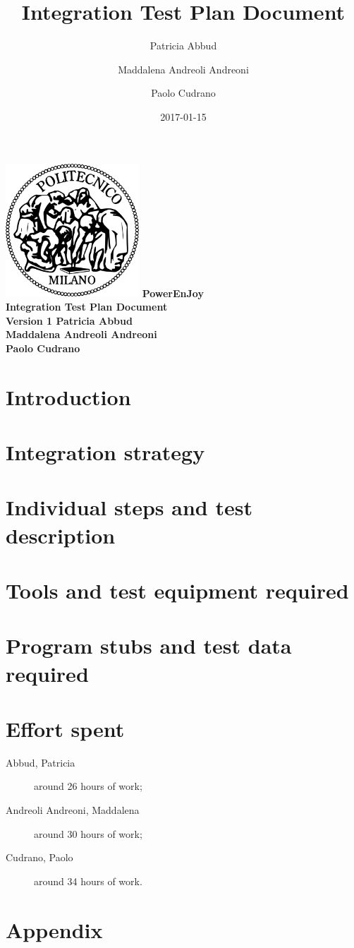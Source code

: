 \documentclass[12pt, a4paper]{article}
\title{Integration Test Plan Document}
\date{2017-01-15}
\author{
	Patricia Abbud
	\and
	Maddalena Andreoli Andreoni
	\and
	Paolo Cudrano
}
\begin{document}
	\begin{titlepage}
		\centering
		\includegraphics[width=5cm]{img/polimi_logo.png} %
		\vfill
		{\bfseries\Large
			PowerEnJoy\\
			Integration Test Plan Document\\
			Version 1
			\vskip4cm
			Patricia Abbud\\
			Maddalena Andreoli Andreoni\\
			Paolo Cudrano\\
		}
		\vfill
		\vfill
	\end{titlepage}

	\tableofcontents
	\newpage

	\section{Introduction}
		

	\newpage
	\section{Integration strategy}
		

	\newpage
	\section{Individual steps and test description}
		\label{sec: individual_steps}
		

	\newpage
	\section{Tools and test equipment required}
		

	\newpage
	\section{Program stubs and test data required}
		

	\newpage
	\section{Effort spent}
		\begin{description}
			\item[Abbud, Patricia] around 26 hours of work;
			\item[Andreoli Andreoni, Maddalena] around 30 hours of work;
			\item[Cudrano, Paolo] around 34 hours of work.
		\end{description}

	\newpage
	\section{Appendix}
	\listoffigures
\end{document}
